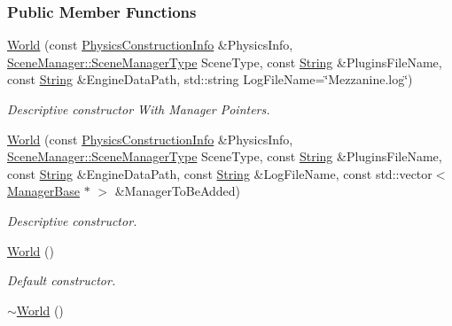 \subsubsection*{Public Member Functions}
\begin{DoxyCompactItemize}
\item 
\hyperlink{classMezzanine_1_1World_a7621d71f549867f04d582afdead60363}{World} (const \hyperlink{classMezzanine_1_1PhysicsConstructionInfo}{PhysicsConstructionInfo} \&PhysicsInfo, \hyperlink{classMezzanine_1_1SceneManager_ad6e20c08b97a230314abda3e5826f274}{SceneManager::SceneManagerType} SceneType, const \hyperlink{namespaceMezzanine_acf9fcc130e6ebf08e3d8491aebcf1c86}{String} \&PluginsFileName, const \hyperlink{namespaceMezzanine_acf9fcc130e6ebf08e3d8491aebcf1c86}{String} \&EngineDataPath, std::string LogFileName=\char`\"{}Mezzanine.log\char`\"{})
\begin{DoxyCompactList}\small\item\em Descriptive constructor With Manager Pointers. \item\end{DoxyCompactList}\item 
\hyperlink{classMezzanine_1_1World_ade1cbb85b206dffa93b963850358d08c}{World} (const \hyperlink{classMezzanine_1_1PhysicsConstructionInfo}{PhysicsConstructionInfo} \&PhysicsInfo, \hyperlink{classMezzanine_1_1SceneManager_ad6e20c08b97a230314abda3e5826f274}{SceneManager::SceneManagerType} SceneType, const \hyperlink{namespaceMezzanine_acf9fcc130e6ebf08e3d8491aebcf1c86}{String} \&PluginsFileName, const \hyperlink{namespaceMezzanine_acf9fcc130e6ebf08e3d8491aebcf1c86}{String} \&EngineDataPath, const \hyperlink{namespaceMezzanine_acf9fcc130e6ebf08e3d8491aebcf1c86}{String} \&LogFileName, const std::vector$<$ \hyperlink{classMezzanine_1_1ManagerBase}{ManagerBase} $\ast$ $>$ \&ManagerToBeAdded)
\begin{DoxyCompactList}\small\item\em Descriptive constructor. \item\end{DoxyCompactList}\item 
\hyperlink{classMezzanine_1_1World_aa6bf8150f82691b821ae43e9d2b0b4fd}{World} ()
\begin{DoxyCompactList}\small\item\em Default constructor. \item\end{DoxyCompactList}\item 
\hyperlink{classMezzanine_1_1World_ab533dec5e04892f3db0dbe7c01732b0a}{$\sim$World} ()

\end{DoxyCompactItemize}
